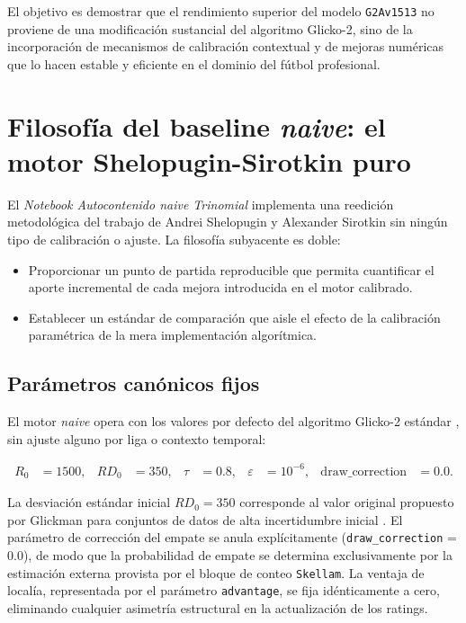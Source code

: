 El objetivo es demostrar que el rendimiento superior del modelo \texttt{G2Av1513} no proviene de una modificaci\'on sustancial del algoritmo Glicko-2, sino de la incorporaci\'on de mecanismos de calibraci\'on contextual y de mejoras num\'ericas que lo hacen estable y eficiente en el dominio del f\'utbol profesional.


\section{Filosof\'ia del baseline \textit{naive}: el motor Shelopugin-Sirotkin puro}

El \textit{Notebook Autocontenido \textit{naive} Trinomial} implementa una reedici\'on metodol\'ogica del trabajo de Andrei Shelopugin y Alexander Sirotkin \cite{Glicko2Mod} sin ning\'un tipo de calibraci\'on o ajuste. La filosof\'ia subyacente es doble: 

\begin{itemize}
	\item Proporcionar un punto de partida reproducible que permita cuantificar el aporte incremental de cada mejora introducida en el motor calibrado.
	\item Establecer un est\'andar de comparaci\'on que aisle el efecto de la calibraci\'on param\'etrica de la mera implementaci\'on algor\'itmica.
\end{itemize}

\subsection{Par\'ametros can\'onicos fijos}

El motor \textit{naive} opera con los valores por defecto del algoritmo Glicko-2 est\'andar \cite{Glickman2022}, sin ajuste alguno por liga o contexto temporal:

\begin{align}
	R_0 &= 1500, &
	RD_0 &= 350, &
	\tau &= 0.8, &
	\varepsilon &= 10^{-6}, &
	\text{draw\_correction} &= 0.0.
\end{align}

La desviaci\'on est\'andar inicial $RD_0 = 350$ corresponde al valor original propuesto por Glickman para conjuntos de datos de alta incertidumbre inicial \cite{Glickman2022}. El par\'ametro de correcci\'on del empate se anula expl\'icitamente (\texttt{draw\_correction} = 0.0), de modo que la probabilidad de empate se determina exclusivamente por la estimaci\'on externa provista por el bloque de conteo \texttt{Skellam}. La ventaja de local\'ia, representada por el par\'ametro \texttt{advantage}, se fija id\'enticamente a cero, eliminando cualquier asimetr\'ia estructural en la actualizaci\'on de los ratings.

